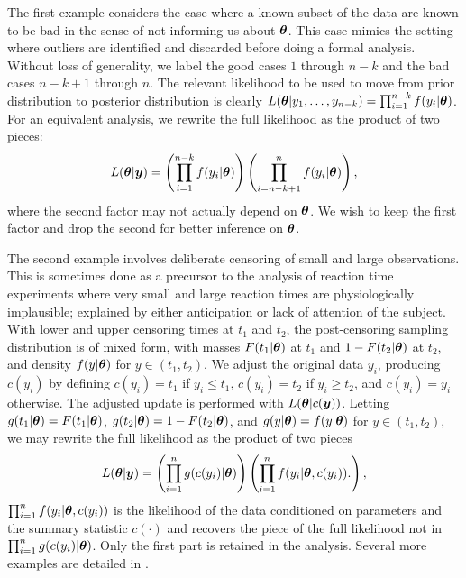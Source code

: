 \documentclass[ba]{imsart}
\def\bth{\mbox{\boldmath $\theta$}}
\newcommand{\by}{\mbox{\boldmath $y$}}
\begin{document}
The first example considers the case where a known subset of the data are known to be 
bad in the sense of not informing us about $\bth$.  This case mimics the setting where outliers are identified and discarded before doing a formal analysis.  Without loss of generality, we label the good cases $1$ through $n-k$ and the bad cases $n-k+1$ through $n$.  The relevant likelihood to be used to move from prior distribution to posterior distribution is clearly $L(\bth | y_1, \ldots, y_{n-k}) = \prod_{i=1}^{n-k} f(y_i | \bth)$.  For an equivalent analysis, we rewrite the full likelihood as the product of two pieces:
\begin{eqnarray}
\label{OutlyingCases}
L(\bth | \by)  
= \left( \prod_{i=1}^{n-k} f(y_i | \bth) \right) \left( \prod_{i=n-k+1}^{n} f(y_i | \bth) \right), 
\end{eqnarray}
where the second factor may not actually depend on $\bth$. We wish to keep the first factor and drop the second for better inference on $\bth$.

The second example involves deliberate censoring of small and large observations. This is
sometimes done as a precursor to the analysis of reaction time experiments  \citep[e.g.,][]{ratcliff1993} where very small and large reaction times are physiologically implausible;  explained by either anticipation or lack of attention of the subject.  
With lower and upper censoring times at $t_1$ and $t_2$, the post-censoring sampling distribution is of mixed form, with masses $F(t_1|\bth)$ at $t_1$ and $1-F(t_2|\bth)$ at $t_2$,
and density $f(y | \bth)$ for $y \in (t_1, t_2)$.  We adjust the original data $y_i$,
producing $c(y_i)$ by defining $c(y_i)= t_1$ if $y_i \leq t_1$, $c(y_i)=t_2$ 
if $y_i \geq t_2$, and $c(y_i)=y_i$ otherwise.  
The adjusted update is performed with $L(\bth |c(\by))$.  
Letting $g(t_1|\bth) = F(t_1|\bth)$,
$g(t_2 | \bth) = 1 - F(t_2|\bth)$, and $g(y|\bth)=f(y|\bth)$ for
$y \in (t_1, t_2)$, we may rewrite the full 
likelihood as the product of two pieces
\begin{eqnarray}
\label{Censoring} 
L(\bth  | \by) =  \left( \prod_{i=1}^n g(c(y_i)  | \bth) \right) \left( \prod_{i=1}^n f(y_i|\bth,c(y_i)). \right) ,  
\end{eqnarray}
$\prod_{i=1}^n f(y_i|\bth,c(y_i))$ is the likelihood of the data conditioned on parameters and the summary statistic $c(\cdot)$ and recovers the piece of the full likelihood not in $ \prod_{i=1}^n g(c(y_i)  | \bth)$. Only the first part is retained in the analysis. Several more examples are detailed in \cite{lewis2014}.
\end{document}
